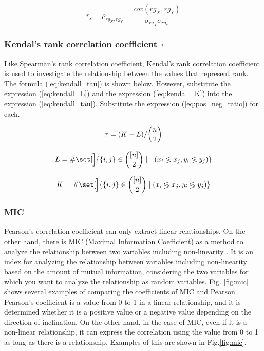 \documentclass[review]{elsarticle}
\DeclarePairedDelimiter\set\{\}
\begin{document}
\begin{equation}\label{eq:spearman_rho}
r_s = \rho_{rg_X,rg_Y} = \frac{cov(rg_X,rg_Y)}{\sigma_{rg_X} \sigma_{rg_Y}}
\end{equation}

\subsubsection{Kendal's rank correlation coefficient \(\tau\)}\label{correl_kendall}

Like Spearman's rank correlation coefficient, Kendal's rank correlation coefficient is used to investigate the relationship between the values that represent rank. The formula (\ref{eq:kendall_tau}) is shown below. However, substitute the expression (\ref{eq:kendall_L}) and the expression (\ref{eq:kendall_K}) into the expression (\ref{eq:kendall_tau}). Substitute the expression (\ref{eq:pos_neg_ratio}) for each.


\begin{equation}\label{eq:kendall_tau}
\tau = (K-L)/\dbinom{n}{2}
\end{equation}

\begin{equation}\label{eq:kendall_L}
L = \# \set[\Big]{\{i,j\} \in \binom{[n]}{2} \mid \neg (x_i \lessgtr x_j, y_i \lessgtr y_j ) }
\end{equation}

\begin{equation}\label{eq:kendall_K}
K = \# \set[\Big]{\{i,j\} \in \binom{[n]}{2} \mid (x_i \lessgtr x_j, y_i \lessgtr y_j ) }
\end{equation}

\subsubsection{MIC}\label{mic}

Pearson's correlation coefficient can only extract linear relationships. On the other hand, there is MIC (Maximal Information Coefficient) as a method to analyze the relationship between two variables including non-linearity \cite[][]{Reshef2011}. It is an index for analyzing the relationship between variables including non-linearity based on the amount of mutual information, considering the two variables for which you want to analyze the relationship as random variables. Fig. \ref{fig:mic} shows several examples of comparing the coefficients of MIC and Pearson. Pearson's coefficient is a value from 0 to 1 in a linear relationship, and it is determined whether it is a positive value or a negative value depending on the direction of inclination. On the other hand, in the case of MIC, even if it is a non-linear relationship, it can express the correlation using the value from 0 to 1 as long as there is a relationship. Examples of this are shown in Fig.\ref{fig:mic}.
\end{document}
